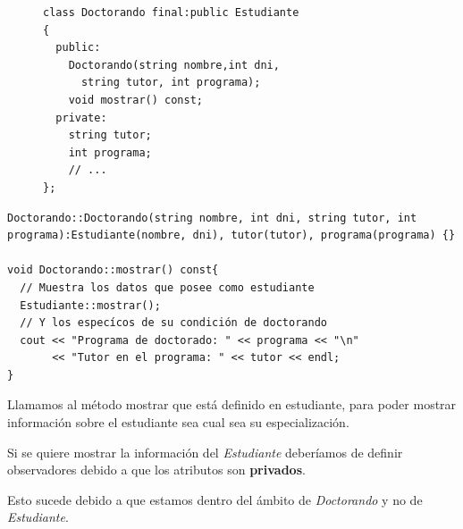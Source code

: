 \begin{figure}
\begin{minipage}[t]{0.7\textwidth}
\begin{lstlisting}[frame=single]
class Doctorando final:public Estudiante
{
  public:
    Doctorando(string nombre,int dni,
	  string tutor, int programa);
    void mostrar() const;
  private:
    string tutor; 
    int programa; 
    // ...
};
	\end{lstlisting}
\end{minipage}
\end{figure}

\begin{center}
	\begin{lstlisting}[frame=single]
Doctorando::Doctorando(string nombre, int dni, string tutor, int programa):Estudiante(nombre, dni), tutor(tutor), programa(programa) {}
  
void Doctorando::mostrar() const{
  // Muestra los datos que posee como estudiante
  Estudiante::mostrar();
  // Y los especícos de su condición de doctorando
  cout << "Programa de doctorado: " << programa << "\n"
       << "Tutor en el programa: " << tutor << endl;
}
\end{lstlisting}
\end{center}

Llamamos al método mostrar que está definido en estudiante, para poder mostrar información sobre el estudiante sea cual sea su especialización.

Si se quiere mostrar la información del \textit{Estudiante} deberíamos de definir observadores debido a que los atributos son \textbf{privados}.

Esto sucede debido a que estamos dentro del ámbito de \textit{Doctorando} y no de \textit{Estudiante}.

